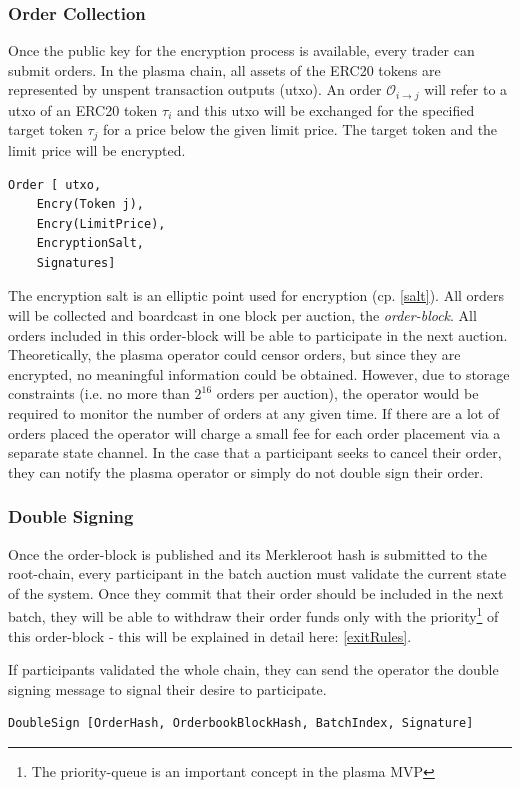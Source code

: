 \documentclass[11pt,parskip=full]{scrartcl}%
\def\pO{\mathcal{O}}
\def\ra{\rightarrow}
\newcommand*{\erc}{ERC20 }
\begin{document}
\subsubsection{Order Collection}
\label{orderblock}
Once the public key for the encryption process is available, every trader can submit orders. 
In the plasma chain, all assets of the ERC20 tokens are represented by unspent transaction outputs (utxo). 
An order $\pO_{i\ra j}$ will refer to a utxo of an \erc token $\tau_i$ and this utxo will be exchanged for the specified target token $\tau_j$ for a price below the given limit price. The target token and the limit price will be encrypted.

\begin{verbatim}
Order [ utxo,
    Encry(Token j),
    Encry(LimitPrice),
    EncryptionSalt,
    Signatures]
\end{verbatim} 
The encryption salt is an elliptic point used for encryption (cp. \ref{salt}). 
All orders will be collected and boardcast in one block per auction, the \emph{order-block}. 
All orders included in this order-block will be able to participate in the next auction. 
Theoretically, the plasma operator could censor orders, but since they are encrypted, no meaningful information could be obtained.
However, due to storage constraints (i.e. no more than $2^{16}$ orders per auction), the operator would be required to monitor the number of orders at any given time.
If there are a lot of orders placed the operator will charge a small fee for each order placement via a separate state channel. 
In the case that a participant seeks to cancel their order, they can notify the plasma operator or simply do not double sign their order. 

\subsubsection{Double Signing}
Once the order-block is published and its Merkleroot hash is submitted to the root-chain, every participant in the batch auction must validate the current state of the system. 
Once they commit that their order should be included in the next batch, they will be able to withdraw their order funds only with the priority\footnote{The priority-queue is an important concept in the plasma MVP} of this order-block - this will be explained in detail here: \ref{exitRules}.

If participants validated the whole chain, they can send the operator the double signing message to signal their desire to participate. 
\begin{verbatim}
DoubleSign [OrderHash, OrderbookBlockHash, BatchIndex, Signature]
\end{verbatim}
\end{document}
